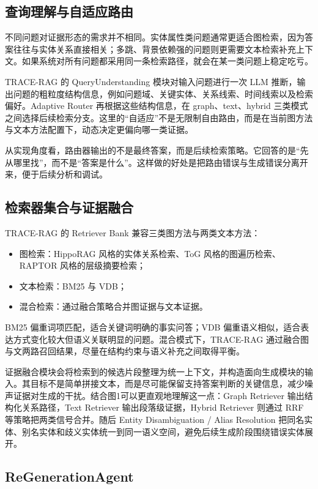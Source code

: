 ﻿\documentclass[UTF8,11pt,twocolumn]{ctexart}
\begin{document}
\subsection{查询理解与自适应路由}

不同问题对证据形态的需求并不相同。实体属性类问题通常更适合图检索，因为答案往往与实体关系直接相关；多跳、背景依赖强的问题则更需要文本检索补充上下文。如果系统对所有问题都采用同一条检索路径，就会在某一类问题上稳定吃亏。

TRACE-RAG 的 QueryUnderstanding 模块对输入问题进行一次 LLM 推断，输出问题的粗粒度结构信息，例如问题域、关键实体、关系线索、时间线索以及检索偏好。Adaptive Router 再根据这些结构信息，在 graph、text、hybrid 三类模式之间选择后续检索分支。这里的“自适应”不是无限制自由路由，而是在当前图方法与文本方法配置下，动态决定更偏向哪一类证据。

从实现角度看，路由器输出的不是最终答案，而是后续检索策略。它回答的是“先从哪里找”，而不是“答案是什么”。这样做的好处是把路由错误与生成错误分离开来，便于后续分析和调试。

\subsection{检索器集合与证据融合}

TRACE-RAG 的 Retriever Bank 兼容三类图方法与两类文本方法：

\begin{itemize}[leftmargin=1.5em]
  \item 图检索：HippoRAG 风格的实体关系检索、ToG 风格的图遍历检索、RAPTOR 风格的层级摘要检索；
  \item 文本检索：BM25 与 VDB；
  \item 混合检索：通过融合策略合并图证据与文本证据。
\end{itemize}

BM25 偏重词项匹配，适合关键词明确的事实问答；VDB 偏重语义相似，适合表达方式变化较大但语义关联明显的问题。混合模式下，TRACE-RAG 通过融合图与文两路召回结果，尽量在结构约束与语义补充之间取得平衡。

证据融合模块会将检索到的候选片段整理为统一上下文，并构造面向生成模块的输入。其目标不是简单拼接文本，而是尽可能保留支持答案判断的关键信息，减少噪声证据对生成的干扰。结合图1可以更直观地理解这一点：Graph Retriever 输出结构化关系路径，Text Retriever 输出段落级证据，Hybrid Retriever 则通过 RRF 等策略把两类信号合并。随后 Entity Disambiguation / Alias Resolution 把同名实体、别名实体和歧义实体统一到同一语义空间，避免后续生成阶段围绕错误实体展开。

\subsection{ReGenerationAgent}
\end{document}

